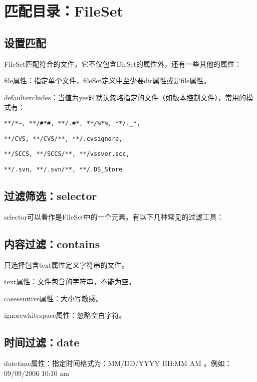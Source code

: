 	

\section{匹配目录：FileSet}

	\subsection{设置匹配}

		FileSet匹配符合的文件，它不仅包含DirSet的属性外，还有一些其他的属性：

		file属性：指定单个文件，fileSet定义中至少要dir属性或是file属性。

		defaultexcludes：当值为yes时默认忽略指定的文件（如版本控制文件），常用的模式有：

		\verb|**/*~, **/#*#, **/.#*, **/%*%, **/._*, |

		\verb|**/CVS, **/CVS/**, **/.cvsignore, |

		\verb|**/SCCS, **/SCCS/**, **/vssver.scc, |

		\verb|**/.svn, **/.svn/**, **/.DS_Store |

	\subsection{过滤筛选：selector}

		selector可以看作是FileSet中的一个元素。有以下几种常见的过滤工具：

	\subsection{内容过滤：contains}

		只选择包含text属性定义字符串的文件。

		text属性：文件包含的字符串，不能为空。

		casesenitive属性：大小写敏感。

		ignorewhitespace属性：忽略空白字符。

		

	\subsection{时间过滤：date}

		datetime属性：指定时间格式为：MM/DD/YYYY HH:MM AM 。例如：09/09/2006 10:10 am

